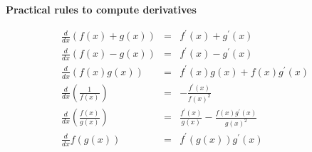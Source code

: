 \documentclass[justified, sixbynine]{tufte-book}
\def\subsubsection#1{{\bf #1}}
\theoremstyle{plain}%
\newtheorem * {corollary}{Corollary}
\theoremstyle{definition}
\theoremstyle{remark}
\newtheorem * {remark}{Remark}
\newtheorem * {note}{Note}
\begin{document}
\begin{fullwidth}
\subsubsection{Practical rules to compute derivatives}

\begin{eqnarray}
\frac d{dx}\left( f(x)+g(x)\right) &=&f^{\prime }(x)+g^{\prime }(x) \\
\frac d{dx}\left( f(x)-g(x)\right) &=&f^{\prime }(x)-g^{\prime }(x) \\
\frac d{dx}\left( f(x)g(x)\right) &=&f^{\prime }(x)g(x)+f(x)g^{\prime }(x) \\
\frac d{dx}\left( \frac 1{f(x)}\right) &=&-\frac{f^{\prime }(x)}{f(x)^2} \\
\frac d{dx}\left( \frac{f(x)}{g(x)}\right) &=&\frac{f^{\prime }(x)}{g(x)}-%
\frac{f(x)g^{\prime }(x)}{g(x)^2} \\
\frac d{dx}f(g(x)) &=&f^{\prime }(g(x))g^{\prime }(x)
\end{eqnarray}

\end{fullwidth}
\backmatter

\printindex
\end{document}
